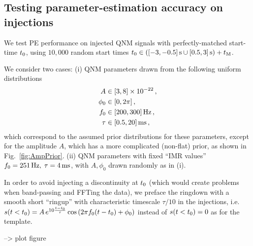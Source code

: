 \documentclass[aps,prd,onecolumn,notitlepage,nofootinbib,superscriptaddress,altaffilletter,floatfix]{revtex4-1}
\begin{document}
\newpage
\subsection{Testing parameter-estimation accuracy on injections}
\label{sec:test-param-estim}

We test PE performance on injected QNM signals with perfectly-matched start-time $t_0$, using $10,000$ random start times
$t_0 \in \left( {[-3,-0.5]}\,\mathrm{s} \cup {[0.5,3]}\,\mathrm{s}\right) + t_{\mathrm{M}}$.

We consider two cases: (i) QNM parameters drawn from the following uniform distributions
\begin{align}
  \label{eq:24}
  A      & \in {[3,8]}\times10^{-22}\,,\\
  \phi_0 &\in {[0,2\pi]}\,,\\
  f_0  &\in {[200,300]}\,\mathrm{Hz}\,,\\
  \tau   &\in {[0.5,20]}\,\mathrm{ms}\,,
\end{align}
which correspond to the assumed prior distributions for these parameters, except for the amplitude $A$, which has a more complicated (non-flat) prior,
as shown in Fig.~\ref{fig:AmpPrior}.
(ii) QNM parameters with fixed ``IMR values'' $f_0 =  251\,\mathrm{Hz},\;\tau = 4\,\mathrm{ms}$, with $A,\phi_0$ drawn randomly as in (i).

In order to avoid injecting a discontinuity at $t_0$ (which would create problems when band-passing and FFTing the data), we preface the ringdown
with a smooth short ``ringup'' with characteristic timescale $\tau/10$ in the injections, i.e.\
$s(t<t_0) = A\,e^{10\frac{t-t_0}{\tau}}\cos\left(2\pi f_0 (t-t_0) + \phi_0\right)$ instead of $s(t<t_0)=0$ as for the template.

--> plot figure
\end{document}
